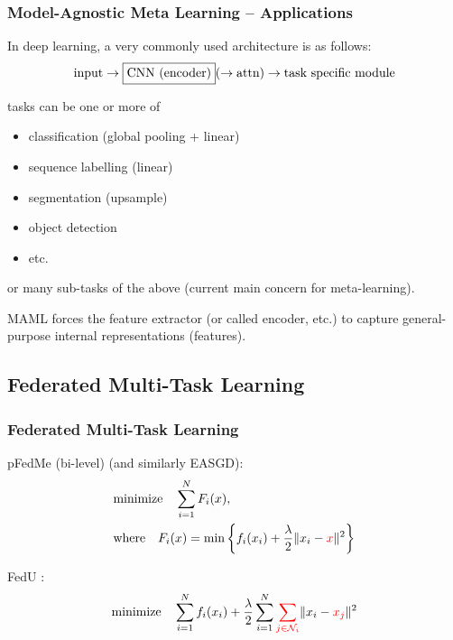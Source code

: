 
\begin{frame}
\frametitle{Model-Agnostic Meta Learning -- Applications}

In deep learning, a very commonly used architecture is as follows:
$$\text{input} \to \framebox{CNN (encoder)} ( \to \text{attn}) \to \text{task specific module}$$

tasks can be one or more of
\begin{itemize}
    \item classification (global pooling + linear)
    \item sequence labelling (linear)
    \item segmentation (upsample)
    \item object detection
    \item etc.
\end{itemize}
or many sub-tasks of the above (current main concern for meta-learning).

MAML forces the feature extractor (or called encoder, etc.) to capture general-purpose internal representations (features).

\end{frame}


\subsection[FMTL]{Federated Multi-Task Learning}


\begin{frame}
\frametitle{Federated Multi-Task Learning}

\begin{itemize}
    \item pFedMe (bi-level) \cite{t2020pfedme} (and similarly EASGD\cite{zhang2015easgd}):
    \begin{align*}
        & \text{minimize} \quad \sum\limits_{i=1}^N F_i(x), \\
        & \text{where} \quad F_i(x) = \min \left\{ f_i(x_i) + \dfrac{\lambda}{2} \lVert x_i - {\color{red} x}\rVert^2 \right\}
    \end{align*}
    {\footnotesize
    \item FedU \cite{dinh2021fedu}:
    $$\text{minimize} \quad \sum\limits_{i=1}^N f_i(x_i) + \dfrac{\lambda}{2} \sum\limits_{i=1}^N {\color{red} \sum\limits_{j\in\mathcal{N}_i}} \lVert x_i - {\color{red} x_j} \rVert^2$$
    }
\end{itemize}


\end{frame}

